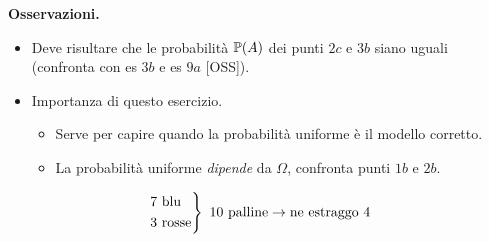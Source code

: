 \textbf{Osservazioni.}
\begin{itemize}
	\item Deve risultare che le probabilità $\mathbb{P}(A)$ dei punti $2c$ e $3b$ siano uguali (confronta con es $3b$ e es $9a$ [OSS]).
	\item Importanza di questo esercizio.
	\begin{itemize}
		\item Serve per capire quando la probabilità uniforme è il modello corretto.
		\item La probabilità uniforme \textit{dipende} da $\Omega $, confronta punti $1b$ e $2b$.
	\end{itemize}
\end{itemize}

\Soluzione

\begin{equation*}
	\begin{drcases}
		7\ \text{blu}\\
		3\ \text{rosse}
	\end{drcases}
	\ 10\ \text{palline}\rightarrow \text{ne estraggo} \ 4
\end{equation*}
